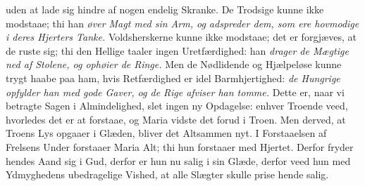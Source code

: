 \documentclass[12pt,a4paper]{book}
\begin{document}
uden at lade sig hindre af nogen endelig Skranke. De Trodsige kunne ikke
modstaae; thi han \emph{øver Magt med sin Arm, og adspreder dem, som ere
hovmodige i deres Hjerters Tanke.} Voldsherskerne kunne ikke modstaae; det er
forgjæves, at de ruste sig; thi den Hellige taaler ingen Uretfærdighed: han
\emph{drager de Mægtige ned af Stolene, og ophøier de Ringe.} Men de Nødlidende
og Hjælpeløse kunne trygt haabe paa ham, hvis Retfærdighed er idel
Barmhjertighed: \emph{de Hungrige opfylder han med gode Gaver, og de Rige afviser
han tomme.} Dette er, naar vi betragte Sagen i Almindelighed, slet ingen ny
Opdagelse: enhver Troende veed, hvorledes det er at forstaae, og Maria vidste det
forud i Troen. Men derved, at Troens Lys opgaaer i Glæden, bliver det Altsammen
nyt. I Forstaaelsen af Frelsens Under forstaaer Maria Alt; thi hun forstaaer med
Hjertet. Derfor fryder hendes Aand sig i Gud, derfor er hun nu salig i sin Glæde,
derfor veed hun med Ydmyghedens ubedragelige Vished, at alle Slægter skulle prise
hende salig.
\end{document}
